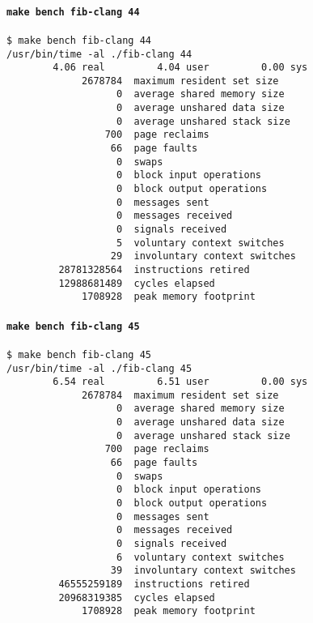 \documentclass{article}
\begin{document}
\paragraph{\lstinline!make bench fib-clang 44!}
\begin{lstlisting}[language=none]
$ make bench fib-clang 44
/usr/bin/time -al ./fib-clang 44
        4.06 real         4.04 user         0.00 sys
             2678784  maximum resident set size
                   0  average shared memory size
                   0  average unshared data size
                   0  average unshared stack size
                 700  page reclaims
                  66  page faults
                   0  swaps
                   0  block input operations
                   0  block output operations
                   0  messages sent
                   0  messages received
                   0  signals received
                   5  voluntary context switches
                  29  involuntary context switches
         28781328564  instructions retired
         12988681489  cycles elapsed
             1708928  peak memory footprint
\end{lstlisting}


\paragraph{\lstinline!make bench fib-clang 45!}
\begin{lstlisting}[language=none]
$ make bench fib-clang 45
/usr/bin/time -al ./fib-clang 45
        6.54 real         6.51 user         0.00 sys
             2678784  maximum resident set size
                   0  average shared memory size
                   0  average unshared data size
                   0  average unshared stack size
                 700  page reclaims
                  66  page faults
                   0  swaps
                   0  block input operations
                   0  block output operations
                   0  messages sent
                   0  messages received
                   0  signals received
                   6  voluntary context switches
                  39  involuntary context switches
         46555259189  instructions retired
         20968319385  cycles elapsed
             1708928  peak memory footprint
\end{lstlisting}
\end{document}
